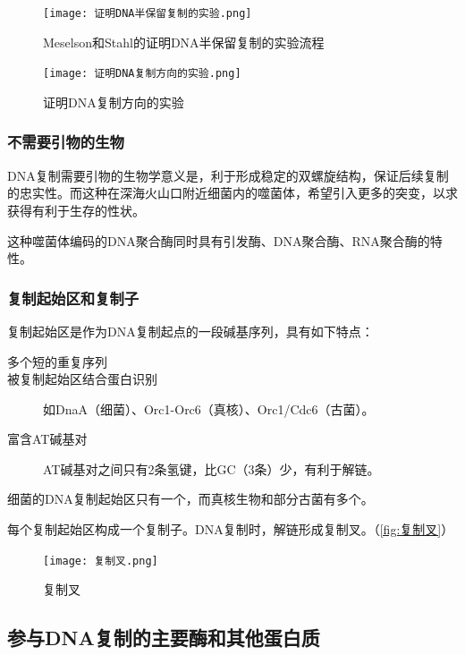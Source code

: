 \begin{figure}[htbp]
	\centering
	\texttt{[image: 证明DNA半保留复制的实验.png]}
	\caption{Meselson和Stahl的证明DNA半保留复制的实验流程}
	\label{fig:Meselson和Stahl的证明DNA半保留复制的实验流程}
\end{figure}

\begin{figure}[htbp]
	\centering
	\texttt{[image: 证明DNA复制方向的实验.png]}
	\caption{证明DNA复制方向的实验}
	\label{fig:证明DNA复制方向的实验}
\end{figure}

\subsubsection{不需要引物的生物}

DNA复制需要引物的生物学意义是，利于形成稳定的双螺旋结构，保证后续复制的忠实性。而这种在深海火山口附近细菌内的噬菌体，希望引入更多的突变，以求获得有利于生存的性状。

这种噬菌体编码的DNA聚合酶同时具有引发酶、DNA聚合酶、RNA聚合酶的特性。

\subsubsection{复制起始区和复制子}

复制起始区是作为DNA复制起点的一段碱基序列，具有如下特点：
\begin{description}
	\item[多个短的重复序列]
	\item[被复制起始区结合蛋白识别] 如DnaA（细菌）、Orc1-Orc6（真核）、Orc1/Cdc6（古菌）。
	\item[富含AT碱基对] AT碱基对之间只有2条氢键，比GC（3条）少，有利于解链。
\end{description}

细菌的DNA复制起始区只有一个，而真核生物和部分古菌有多个。

每个复制起始区构成一个复制子。DNA复制时，解链形成复制叉。（\autoref{fig:复制叉}）

\begin{figure}[htbp]
	\centering
	\texttt{[image: 复制叉.png]}
	\caption{复制叉}
	\label{fig:复制叉}
\end{figure}

\subsection{参与DNA复制的主要酶和其他蛋白质}


